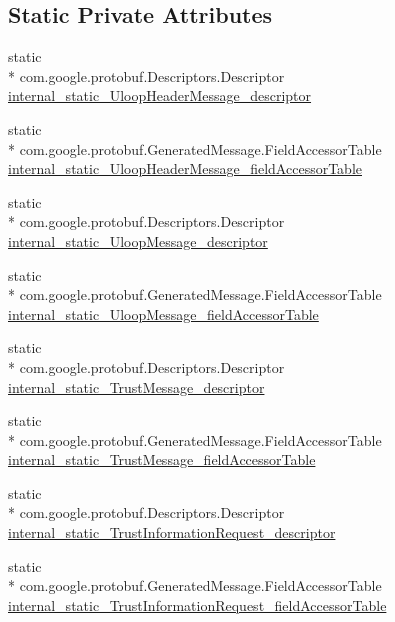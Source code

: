 \subsection*{Static Private Attributes}
\begin{DoxyCompactItemize}
\item 
static \\*
com.\+google.\+protobuf.\+Descriptors.\+Descriptor \hyperlink{classeu_1_1uloop_1_1messages_1_1UloopMessages_a92756ddbdccab1a7b949efc15332a9bc}{internal\+\_\+static\+\_\+\+Uloop\+Header\+Message\+\_\+descriptor}
\item 
static \\*
com.\+google.\+protobuf.\+Generated\+Message.\+Field\+Accessor\+Table \hyperlink{classeu_1_1uloop_1_1messages_1_1UloopMessages_a0a2d5416115a8a55909263b7b9dfb426}{internal\+\_\+static\+\_\+\+Uloop\+Header\+Message\+\_\+field\+Accessor\+Table}
\item 
static \\*
com.\+google.\+protobuf.\+Descriptors.\+Descriptor \hyperlink{classeu_1_1uloop_1_1messages_1_1UloopMessages_aadb12b9c55c653d196602ff19c5363d8}{internal\+\_\+static\+\_\+\+Uloop\+Message\+\_\+descriptor}
\item 
static \\*
com.\+google.\+protobuf.\+Generated\+Message.\+Field\+Accessor\+Table \hyperlink{classeu_1_1uloop_1_1messages_1_1UloopMessages_ae0cd74209ad30222560d98b1f128284b}{internal\+\_\+static\+\_\+\+Uloop\+Message\+\_\+field\+Accessor\+Table}
\item 
static \\*
com.\+google.\+protobuf.\+Descriptors.\+Descriptor \hyperlink{classeu_1_1uloop_1_1messages_1_1UloopMessages_a1a6d4025f05bf288d58b169382c9c9e2}{internal\+\_\+static\+\_\+\+Trust\+Message\+\_\+descriptor}
\item 
static \\*
com.\+google.\+protobuf.\+Generated\+Message.\+Field\+Accessor\+Table \hyperlink{classeu_1_1uloop_1_1messages_1_1UloopMessages_a83ff78d9cd200ccaaadeabb6a2a9b56a}{internal\+\_\+static\+\_\+\+Trust\+Message\+\_\+field\+Accessor\+Table}
\item 
static \\*
com.\+google.\+protobuf.\+Descriptors.\+Descriptor \hyperlink{classeu_1_1uloop_1_1messages_1_1UloopMessages_a895ebcb0f3a6f7aa01aa805496a74fee}{internal\+\_\+static\+\_\+\+Trust\+Information\+Request\+\_\+descriptor}
\item 
static \\*
com.\+google.\+protobuf.\+Generated\+Message.\+Field\+Accessor\+Table \hyperlink{classeu_1_1uloop_1_1messages_1_1UloopMessages_a0fc348dcef0a2592edb3e59ce006cae9}{internal\+\_\+static\+\_\+\+Trust\+Information\+Request\+\_\+field\+Accessor\+Table}

\end{DoxyCompactItemize}
